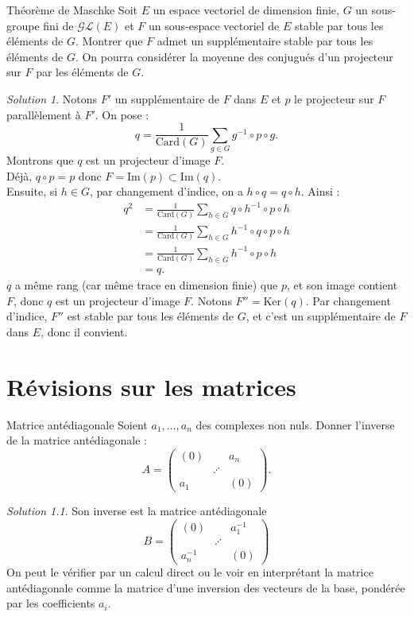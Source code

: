 \documentclass[french]{book}
\newcommand{\inv}{^{-1}}
\renewcommand{\ker}{\text{Ker}}
\newcommand{\card}{\text{Card}}
\theoremstyle{definition}
\theoremstyle{remark}
\newtheorem*{sol}{Solution}
\begin{document}
\begin{exo}[3]{Théorème de Maschke}
	Soit $E$ un espace vectoriel de dimension finie, $G$ un sous-groupe fini de $\mathcal{GL}(E)$ et $F$ un sous-espace vectoriel de $E$ stable par tous les éléments de $G$. Montrer que $F$ admet un supplémentaire stable par tous les éléments de $G$. On pourra considérer la moyenne des conjugués d'un projecteur sur $F$ par les éléments de $G$.
\end{exo}
\begin{sol}
	Notons $F'$ un supplémentaire de $F$ dans $E$ et $p$ le projecteur sur $F$ parallèlement à $F'$. On pose :
	$$q=\frac{1}{\card(G)}\sum_{g\in G}g\inv\circ p\circ g.$$
	Montrons que $q$ est un projecteur d'image $F$.\\
	Déjà, $q\circ p=p$ donc $F=\text{Im}(p)\subset\text{Im}(q)$. \\
	Ensuite, si $h\in G$, par changement d'indice, on a $h\circ q=q\circ h$. Ainsi :
	\begin{align*}
		q^2&=\frac{1}{\card(G)}\sum_{h\in G}q\circ h\inv \circ p\circ h\\
		&=\frac{1}{\card(G)}\sum_{h\in G}h\inv\circ q\circ p\circ  h\\
		&=\frac{1}{\card(G)}\sum_{h\in G}h\inv\circ p\circ  h\\
		&=q.
	\end{align*}
	$q$ a même rang (car même trace en dimension finie) que $p$, et son image contient $F$, donc $q$ est un projecteur d'image $F$. Notons $F''=\ker(q)$. Par changement d'indice, $F''$ est stable par tous les éléments de $G$, et c'est un supplémentaire de $F$ dans $E$, donc il convient.
\end{sol}

\chapter{Révisions sur les matrices}

\begin{exo}[0]{Matrice antédiagonale}
	Soient $a_1,\ldots,a_n$ des complexes non nuls. Donner l'inverse de la matrice antédiagonale : $$A=\begin{pmatrix}
		(0)&&a_n \\
		&\iddots&\\
		a_1&&(0)
	\end{pmatrix}.$$
\end{exo}
\begin{sol}
	Son inverse est la matrice antédiagonale $$B=\begin{pmatrix}
		(0)&&a_1\inv \\
		&\iddots&\\
		a_n\inv&&(0)
	\end{pmatrix}$$ On peut le vérifier par un calcul direct ou le voir en interprétant la matrice antédiagonale comme la matrice d'une inversion des vecteurs de la base, pondérée par les coefficients $a_i$.
\end{sol}
\end{document}
